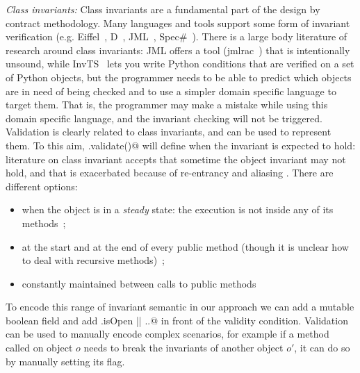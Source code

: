 \noindent\textit{Class invariants:}
Class invariants are a fundamental part of the design by contract methodology. 
Many languages and tools support some form of invariant verification (e.g. Eiffel~\cite{Meyer:1992:EL:129093}, D~\cite{Alexandrescu:2010:DPL:1875434}, JML~\cite{Burdy2005}, Spec\#~\cite{Barnett:2004:SPS:2131546.2131549}).
There is a large body literature of research around class invariants:
JML offers a tool (jmlrac~\cite{Burdy2005}) that is intentionally unsound,
while InvTS~\cite{gorbovitski08efficient} lets you write Python conditions
 that are verified on a set of Python objects, but the programmer needs to be able
 to predict which objects are in need of being checked and to use a simpler domain
 specific language to target them. That is, the programmer may make a mistake
while using this domain specific language, and the invariant checking
will not be triggered.
Validation is clearly related to class invariants, and can be used to represent them.
To this aim, \Q@.validate()@ will define when the invariant is expected to hold:
literature on class invariant accepts that sometime the object invariant may not hold,
and that is exacerbated because of re-entrancy and aliasing
\cite{leino2004object,drossopoulou2008unified}.
There are different options:
\begin{itemize}
\item  when the object is in a \textit{steady} state:
 the execution is not inside any of its methods~\cite{Gopinathan:2008:RMO:1483018.1483028};
\item
at the start and at the end of every public method
(though it is unclear how to deal with recursive methods)~\cite{Burdy2005};
\item
constantly maintained between calls to public methods~\cite{DATEplusURL}
\end{itemize}
To encode this range of invariant semantic
in our approach we can add a mutable boolean \Q@isOpen@ field and add \Q@this.isOpen || ..@
in front of the validity condition.
Validation can be used to manually encode complex scenarios,
for example if a method called on object $o$ needs to break the invariants of another object $o'$,
it can do so by manually setting  its \Q@isOpen@ flag.




